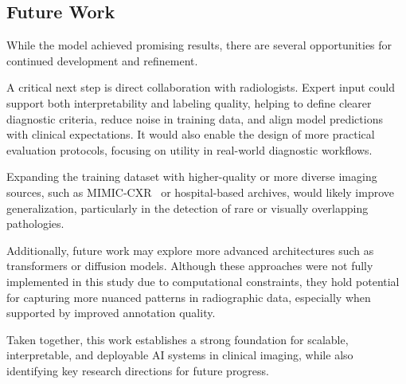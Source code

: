 \documentclass[12pt]{article}
\begin{document}
\begin{multicols}{2}
\subsection{Future Work}
While the model achieved promising results, there are several opportunities for continued development and refinement.

A critical next step is direct collaboration with radiologists. Expert input could support both interpretability and labeling quality, helping to define clearer diagnostic criteria, reduce noise in training data, and align model predictions with clinical expectations. It would also enable the design of more practical evaluation protocols, focusing on utility in real-world diagnostic workflows.

Expanding the training dataset with higher-quality or more diverse imaging sources, such as MIMIC-CXR~\cite{johnson2019mimic} or hospital-based archives, would likely improve generalization, particularly in the detection of rare or visually overlapping pathologies.

Additionally, future work may explore more advanced architectures such as transformers or diffusion models. Although these approaches were not fully implemented in this study due to computational constraints, they hold potential for capturing more nuanced patterns in radiographic data, especially when supported by improved annotation quality.

Taken together, this work establishes a strong foundation for scalable, interpretable, and deployable AI systems in clinical imaging, while also identifying key research directions for future progress.


\end{multicols}

\vspace{200pt}

\pagebreak
\end{document}
